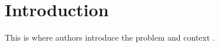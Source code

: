 \section{Introduction}

This is where authors introduce the problem and context \parencite{Kahveci2026}.